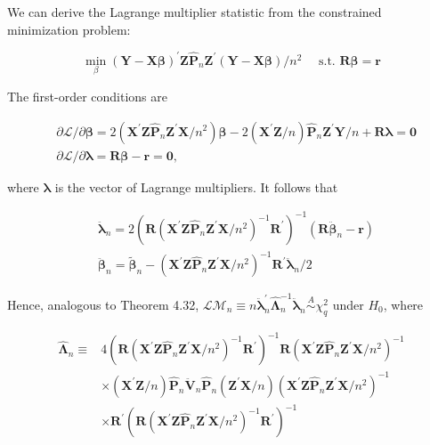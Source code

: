 \documentclass[10pt]{article}
\begin{document}
We can derive the Lagrange multiplier statistic from the constrained minimization problem:

$$
\min _{\beta}(\mathbf{Y}-\mathbf{X} \boldsymbol{\beta})^{\prime} \mathbf{Z} \hat{\mathbf{P}}_{n} \mathbf{Z}^{\prime}(\mathbf{Y}-\mathbf{X} \boldsymbol{\beta}) / n^{2} \quad \text { s.t. } \mathbf{R} \boldsymbol{\beta}=\mathbf{r}
$$

The first-order conditions are

$$
\begin{aligned}
& \partial \mathcal{L} / \partial \boldsymbol{\beta}=2\left(\mathbf{X}^{\prime} \mathbf{Z} \hat{\mathbf{P}}_{n} \mathbf{Z}^{\prime} \mathbf{X} / n^{2}\right) \boldsymbol{\beta}-2\left(\mathbf{X}^{\prime} \mathbf{Z} / n\right) \hat{\mathbf{P}}_{n} \mathbf{Z}^{\prime} \mathbf{Y} / n+\mathbf{R} \boldsymbol{\lambda}=\mathbf{0} \\
& \partial \mathcal{L} / \partial \boldsymbol{\lambda}=\mathbf{R} \boldsymbol{\beta}-\mathbf{r}=\mathbf{0},
\end{aligned}
$$

where $\boldsymbol{\lambda}$ is the vector of Lagrange multipliers. It follows that

$$
\begin{aligned}
& \ddot{\boldsymbol{\lambda}}_{n}=2\left(\mathbf{R}\left(\mathbf{X}^{\prime} \mathbf{Z} \hat{\mathbf{P}}_{n} \mathbf{Z}^{\prime} \mathbf{X} / n^{2}\right)^{-1} \mathbf{R}^{\prime}\right)^{-1}\left(\mathbf{R} \ddot{\boldsymbol{\beta}}_{n}-\mathbf{r}\right) \\
& \ddot{\boldsymbol{\beta}}_{n}=\tilde{\boldsymbol{\beta}}_{n}-\left(\mathbf{X}^{\prime} \mathbf{Z} \hat{\mathbf{P}}_{n} \mathbf{Z}^{\prime} \mathbf{X} / n^{2}\right)^{-1} \mathbf{R}^{\prime} \ddot{\boldsymbol{\lambda}}_{n} / 2
\end{aligned}
$$

Hence, analogous to Theorem 4.32, $\mathcal{L} \mathcal{M}_{n} \equiv n \ddot{\boldsymbol{\lambda}}_{n}^{\prime} \hat{\boldsymbol{\Lambda}}_{n}^{-1} \ddot{\boldsymbol{\lambda}}_{n} \stackrel{A}{\sim} \chi_{q}^{2}$ under $H_{0}$, where

$$
\begin{aligned}
\hat{\mathbf{\Lambda}}_{n} \equiv & 4\left(\mathbf{R}\left(\mathbf{X}^{\prime} \mathbf{Z} \hat{\mathbf{P}}_{n} \mathbf{Z}^{\prime} \mathbf{X} / n^{2}\right)^{-1} \mathbf{R}^{\prime}\right)^{-1} \mathbf{R}\left(\mathbf{X}^{\prime} \mathbf{Z} \hat{\mathbf{P}}_{n} \mathbf{Z}^{\prime} \mathbf{X} / n^{2}\right)^{-1} \\
& \times\left(\mathbf{X}^{\prime} \mathbf{Z} / n\right) \hat{\mathbf{P}}_{n} \ddot{\mathbf{V}}_{n} \hat{\mathbf{P}}_{n}\left(\mathbf{Z}^{\prime} \mathbf{X} / n\right)\left(\mathbf{X}^{\prime} \mathbf{Z} \hat{\mathbf{P}}_{n} \mathbf{Z}^{\prime} \mathbf{X} / n^{2}\right)^{-1} \\
& \times \mathbf{R}^{\prime}\left(\mathbf{R}\left(\mathbf{X}^{\prime} \mathbf{Z} \hat{\mathbf{P}}_{n} \mathbf{Z}^{\prime} \mathbf{X} / n^{2}\right)^{-1} \mathbf{R}^{\prime}\right)^{-1}
\end{aligned}
$$
\end{document}
